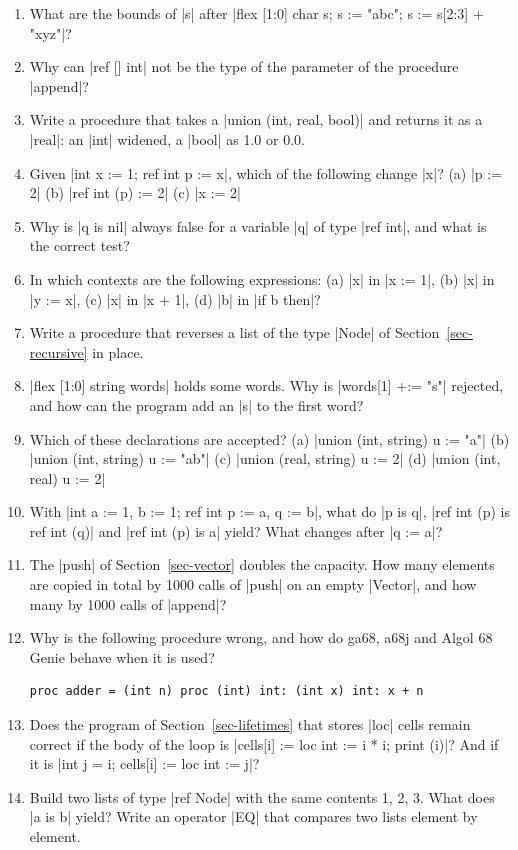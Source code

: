 \begin{enumerate}
\item What are the bounds of \code|s| after
  \code|flex [1:0] char s; s := "abc"; s := s[2:3] + "xyz"|?
\item Why can \code|ref [] int| not be the type of the parameter of the
  procedure \code|append|?
\item Write a procedure that takes a \code|union (int, real, bool)| and
  returns it as a \code|real|: an \code|int| widened, a \code|bool| as
  1.0 or 0.0.
\item Given \code|int x := 1; ref int p := x|, which of the following
  change \code|x|? (a) \code|p := 2| (b) \code|ref int (p) := 2|
  (c) \code|x := 2|
\item Why is \code|q is nil| always false for a variable \code|q| of
  type \code|ref int|, and what is the correct test?
\item In which contexts are the following expressions:
  (a) \code|x| in \code|x := 1|, (b) \code|x| in \code|y := x|,
  (c) \code|x| in \code|x + 1|, (d) \code|b| in \code|if b then|?
\item Write a procedure that reverses a list of the type \code|Node| of
  Section~\ref{sec-recursive} in place.
\item \code|flex [1:0] string words| holds some words. Why is
  \code|words[1] +:= "s"| rejected, and how can the program add an
  \code|s| to the first word?
\item Which of these declarations are accepted?
  (a) \code|union (int, string) u := "a"|
  (b) \code|union (int, string) u := "ab"|
  (c) \code|union (real, string) u := 2|
  (d) \code|union (int, real) u := 2|
\item With \code|int a := 1, b := 1; ref int p := a, q := b|, what do
  \code|p is q|, \code|ref int (p) is ref int (q)| and
  \code|ref int (p) is a| yield? What changes after \code|q := a|?
\item The \code|push| of Section~\ref{sec-vector} doubles the capacity.
  How many elements are copied in total by 1000 calls of \code|push| on
  an empty \code|Vector|, and how many by 1000 calls of \code|append|?
\item Why is the following procedure wrong, and how do ga68, a68j and
  Algol 68 Genie behave when it is used?
\begin{lstlisting}
proc adder = (int n) proc (int) int: (int x) int: x + n
\end{lstlisting}
\item Does the program of Section~\ref{sec-lifetimes} that stores
  \code|loc| cells remain correct if the body of the loop is
  \code|cells[i] := loc int := i * i; print (i)|? And if it is
  \code|int j = i; cells[i] := loc int := j|?
\item Build two lists of type \code|ref Node| with the same contents
  1, 2, 3. What does \code|a is b| yield? Write an operator \code|EQ|
  that compares two lists element by element.
\end{enumerate}

